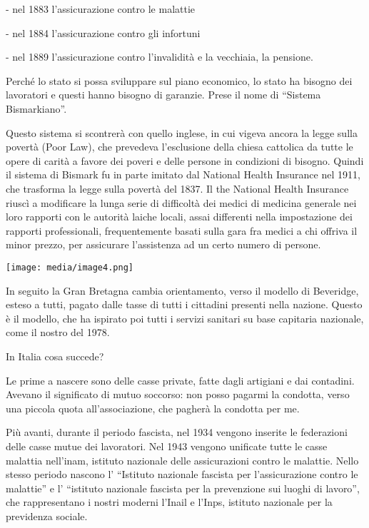 \documentclass[]{article}
\begin{document}
- nel 1883 l'assicurazione contro le malattie

- nel 1884 l'assicurazione contro gli infortuni

- nel 1889 l'assicurazione contro l'invalidità e la vecchiaia, la
pensione.

Perché lo stato si possa sviluppare sul piano economico, lo stato ha
bisogno dei lavoratori e questi hanno bisogno di garanzie. Prese il nome
di ``Sistema Bismarkiano''.

Questo sistema si scontrerà con quello inglese, in cui vigeva ancora la
legge sulla povertà (Poor Law), che prevedeva l'esclusione della chiesa
cattolica da tutte le opere di carità a favore dei poveri e delle
persone in condizioni di bisogno. Quindi il sistema di Bismark fu in
parte imitato dal National Health Insurance nel 1911, che trasforma la
legge sulla povertà del 1837. Il the National Health Insurance riuscì a
modificare la lunga serie di difficoltà dei medici di medicina generale
nei loro rapporti con le autorità laiche locali, assai differenti nella
impostazione dei rapporti professionali, frequentemente basati sulla
gara fra medici a chi offriva il minor prezzo, per assicurare
l'assistenza ad un certo numero di persone.

\texttt{[image: media/image4.png]}

In seguito la Gran Bretagna cambia orientamento, verso il modello di
Beveridge, esteso a tutti, pagato dalle tasse di tutti i cittadini
presenti nella nazione. Questo è il modello, che ha ispirato poi tutti i
servizi sanitari su base capitaria nazionale, come il nostro del 1978.

In Italia cosa succede?

Le prime a nascere sono delle casse private, fatte dagli artigiani e dai
contadini. Avevano il significato di mutuo soccorso: non posso pagarmi
la condotta, verso una piccola quota all'associazione, che pagherà la
condotta per me.

Più avanti, durante il periodo fascista, nel 1934 vengono inserite le
federazioni delle casse mutue dei lavoratori. Nel 1943 vengono unificate
tutte le casse malattia nell'inam, istituto nazionale delle
assicurazioni contro le malattie. Nello stesso periodo nascono l'
``Istituto nazionale fascista per l'assicurazione contro le malattie'' e
l' ``istituto nazionale fascista per la prevenzione sui luoghi di
lavoro'', che rappresentano i nostri moderni l'Inail e l'Inps, istituto
nazionale per la previdenza sociale.
\end{document}
